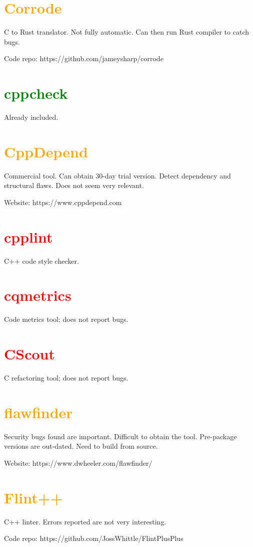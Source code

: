 \documentclass[10pt,letterpaper]{article}
\begin{document}
\section{\textcolor{orange}{Corrode}}

C to Rust translator. Not fully automatic. Can then run Rust compiler to catch bugs.

Code repo: https://github.com/jameysharp/corrode

\section{\textcolor{green}{cppcheck}}

Already included.

\section{\textcolor{orange}{CppDepend}}

Commercial tool. Can obtain 30-day trial version. Detect dependency and
structural flaws. Does not seem very relevant.

Website: https://www.cppdepend.com

\section{\textcolor{red}{cpplint}}

C++ code style checker.

\section{\textcolor{red}{cqmetrics}}

Code metrics tool; does not report bugs.

\section{\textcolor{red}{CScout}}

C refactoring tool; does not report bugs.

\section{\textcolor{orange}{flawfinder}}

Security bugs found are important. Difficult to obtain the tool. Pre-package versions
are out-dated. Need to build from source.

Website: https://www.dwheeler.com/flawfinder/

\section{\textcolor{orange}{Flint++}}

C++ linter. Errors reported are not very interesting.

Code repo: https://github.com/JossWhittle/FlintPlusPlus
\end{document}
